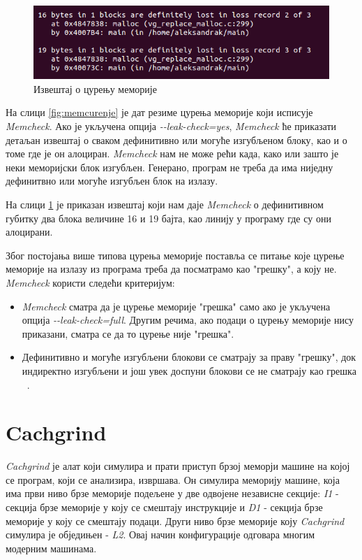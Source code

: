 \documentclass[12pt,oneside]{memoir}
\begin{document}
\begin{figure}[h!]
\begin{center}
\includegraphics[scale=0.75]{slika9.png}
\end{center}
\caption{Извештај о цурењу меморије}
\label{fig:memizv}
\end{figure}


\indent На слици \ref{fig:memcurenje} је дат резиме цурења меморије који исписује \textit{Memcheck}. Ако је укључена опција \textit{-\--leak-check=yes}, \textit{Memcheck} ће приказати детаљан извештај о сваком дефинитивно или могуће изгубљеном блоку,  као и о томе где је он алоциран. \textit{Memcheck} нам не може рећи када, како или зашто је неки меморијски блок изгубљен. Генерано, програм не треба да има ниједну дефинитвно или могуће изгубљен блок на излазу.

\indent На слици \ref{fig:memizv} је приказан извештај који нам даје \textit{Memcheck} о дефинитивном губитку два блока величине 16 и 19 бајта, као линију у програму где су они алоцирани.

\indent Због постојања више типова цурења меморије поставља се питање које цурење меморије на излазу из програма треба да посматрамо као "грешку", а коју не. \textit{Memcheck} користи следећи критеријум:

\begin{itemize}
  \item \textit{Memcheck} сматра да је цурење меморије "грешка" само ако је укључена опција \textit{-\--leak-check=full}. Другим речима, ако подаци о цурењу меморије нису приказани, сматра се да то цурење није "грешка".
  \item Дефинитивно и могуће изгубљени блокови се сматрају за праву "грешку", док индиректно изгубљени и још увек доспуни блокови се не сматрају као грешка ~\cite{memcheckRef}.
\end{itemize}


\section{Cachgrind}
\label{section_cachgrind}

\indent \textit{Cachgrind} је алат који симулира и прати приступ брзој меморји машине на којој се програм, који се анализира, извршава. Он симулира меморију машине, која има први ниво брзе меморије подељене у две одвојене независне секције: \textit{I1} - секција брзе меморије у коју се смештају инструкције и \textit{D1} - секција брзе меморије у коју се смештају подаци. Други ниво брзе меморије коју \textit{Cachgrind} симулира је обједињен - \textit{L2}. Овај начин конфигурације одговара многим модерним машинама.
\end{document}
